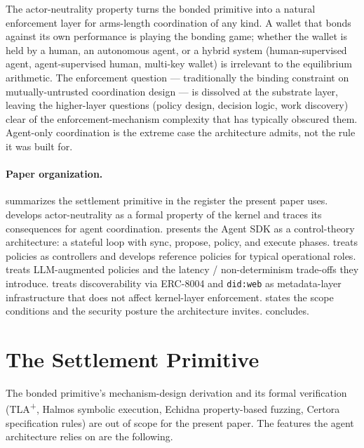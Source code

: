 \documentclass[11pt,a4paper]{article}
\theoremstyle{definition}
\theoremstyle{remark}
\begin{document}
The actor-neutrality property turns the bonded primitive into a
natural enforcement layer for arms-length coordination of any kind.
A wallet that bonds against its own performance is playing the
bonding game; whether the wallet is held by a human, an autonomous
agent, or a hybrid system (human-supervised agent, agent-supervised
human, multi-key wallet) is irrelevant to the equilibrium
arithmetic. The enforcement question --- traditionally the binding
constraint on mutually-untrusted coordination design --- is
dissolved at the substrate layer, leaving the higher-layer
questions (policy design, decision logic, work discovery) clear of
the enforcement-mechanism complexity that has typically obscured
them. Agent-only coordination is the extreme case the architecture
admits, not the rule it was built for.

\paragraph{Paper organization.}
 summarizes the settlement primitive in the
register the present paper uses.
 develops actor-neutrality as a
formal property of the kernel and traces its consequences for
agent coordination.
 presents the Agent SDK as a control-theory
architecture: a stateful loop with sync, propose, policy, and
execute phases.
 treats policies as controllers and develops
reference policies for typical operational roles.
 treats LLM-augmented policies and the latency /
non-determinism trade-offs they introduce.
 treats discoverability via ERC-8004
and \texttt{did:web} as metadata-layer infrastructure that does
not affect kernel-layer enforcement.
 states the scope conditions and the security
posture the architecture invites.
 concludes.

\section{The Settlement Primitive}
\label{sec:primitive}

The bonded primitive's mechanism-design derivation and its formal
verification (TLA\textsuperscript{+}, Halmos symbolic execution,
Echidna property-based fuzzing, Certora specification rules) are
out of scope for the present paper. The features the agent
architecture relies on are the following.
\end{document}
